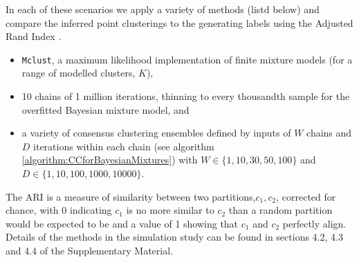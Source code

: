 \documentclass{bioinfo}
\begin{document}
\noindent In each of these scenarios we apply a variety of methods (listd below) and compare the inferred point clusterings to the generating labels using the Adjusted Rand Index \citep[\textbf{ARI}][]{hubert1985comparing}.
\begin{itemize}
	\item \texttt{Mclust}, a maximum likelihood implementation of finite mixture models (for a range of modelled clusters, $K$),
	\item 10 chains of 1 million iterations, thinning to every thousandth sample for the overfitted Bayesian mixture model, and
	\item a variety of consensus clustering ensembles defined by inputs of $W$ chains and $D$ iterations within each chain (see algorithm \ref{algorithm:CCforBayesianMixtures}) with $W \in \{1, 10, 30, 50, 100\}$ and $D \in \{1, 10, 100, 1000, 10000\}$.
\end{itemize}
The ARI is a measure of similarity between two partitions,$c_1, c_2$, corrected for chance, with 0 indicating $c_1$ is no more similar to $c_2$ than a random partition would be expected to be and a value of 1 showing that $c_1$ and $c_2$ perfectly align. Details of the methods in the simulation study can be found in sections 4.2, 4.3 and 4.4 of the Supplementary Material.

\end{document}
